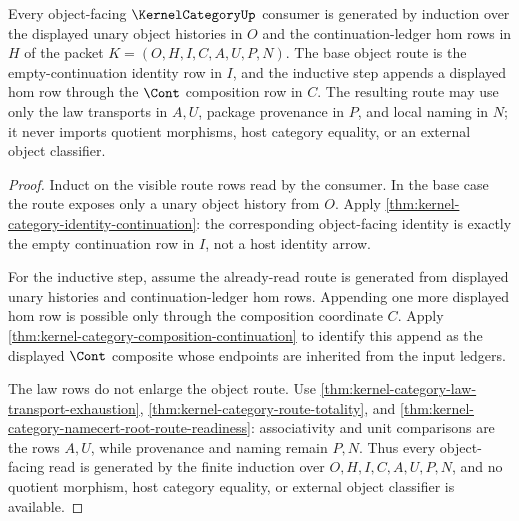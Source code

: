 \begin{theorem}
\label{thm:kernelcategory-inductive-object-route}
Every object-facing $\KernelCategoryUp$ consumer is generated by induction over the displayed unary object histories in $O$ and the continuation-ledger hom rows in $H$ of the packet $K=(O,H,I,C,A,U,P,N)$. The base object route is the empty-continuation identity row in $I$, and the inductive step appends a displayed hom row through the $\Cont$ composition row in $C$. The resulting route may use only the law transports in $A,U$, package provenance in $P$, and local naming in $N$; it never imports quotient morphisms, host category equality, or an external object classifier.
\end{theorem}
\begin{proof}
Induct on the visible route rows read by the consumer. In the base case the route exposes only a unary object history from $O$. Apply \autoref{thm:kernel-category-identity-continuation}: the corresponding object-facing identity is exactly the empty continuation row in $I$, not a host identity arrow.

For the inductive step, assume the already-read route is generated from displayed unary histories and continuation-ledger hom rows. Appending one more displayed hom row is possible only through the composition coordinate $C$. Apply \autoref{thm:kernel-category-composition-continuation} to identify this append as the displayed $\Cont$ composite whose endpoints are inherited from the input ledgers.

The law rows do not enlarge the object route. Use \autoref{thm:kernel-category-law-transport-exhaustion}, \autoref{thm:kernel-category-route-totality}, and \autoref{thm:kernel-category-namecert-root-route-readiness}: associativity and unit comparisons are the rows $A,U$, while provenance and naming remain $P,N$. Thus every object-facing read is generated by the finite induction over $O,H,I,C,A,U,P,N$, and no quotient morphism, host category equality, or external object classifier is available.
\end{proof}
